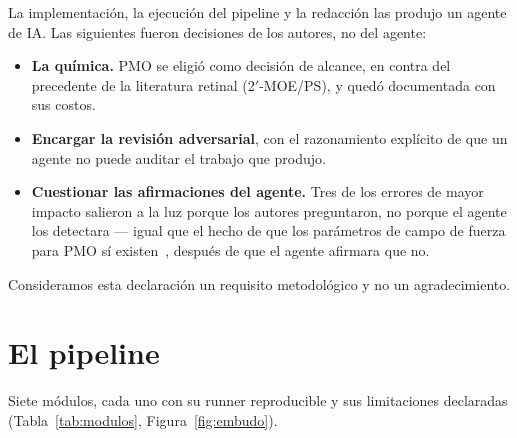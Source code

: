 \documentclass[11pt,a4paper]{article}
\begin{document}
La implementación, la ejecución del pipeline y la redacción las produjo un agente de IA. Las
siguientes fueron decisiones de los autores, no del agente:

\begin{itemize}[nosep, leftmargin=1.4em]
  \item \textbf{La química.} PMO se eligió como decisión de alcance, en contra del precedente de la
        literatura retinal (2$'$-MOE/PS), y quedó documentada con sus costos.
  \item \textbf{Encargar la revisión adversarial}, con el razonamiento explícito de que un agente no
        puede auditar el trabajo que produjo.
  \item \textbf{Cuestionar las afirmaciones del agente.} Tres de los errores de mayor impacto
        salieron a la luz porque los autores preguntaron, no porque el agente los detectara --- igual
        que el hecho de que los parámetros de campo de fuerza para PMO sí
        existen~\cite{maksudov2023}, después de que el agente afirmara que no.
\end{itemize}

Consideramos esta declaración un requisito metodológico y no un agradecimiento.

\section{El pipeline}
\label{sec:pipeline}

Siete módulos, cada uno con su runner reproducible y sus limitaciones declaradas
(Tabla~\ref{tab:modulos}, Figura~\ref{fig:embudo}).
\end{document}
